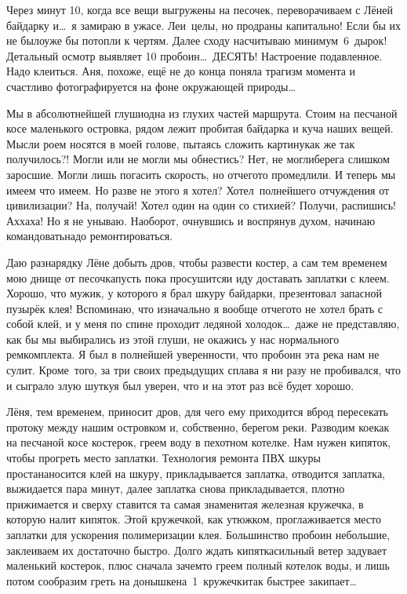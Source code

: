 Через минут 10, когда все вещи выгружены на песочек, переворачиваем с Лёней байдарку и\ldots~я замираю в ужасе. Леи~целы, но продраны капитально! Если бы их не было\mdash уже бы потопли к чертям. Далее сходу насчитываю минимум~6~дырок! Детальный осмотр выявляет 10 пробоин\ldots~ДЕСЯТЬ! Настроение подавленное. Надо клеиться. Аня, похоже, ещё не до конца поняла трагизм момента и счастливо фотографируется на фоне окружающей природы\ldots~

Мы в абсолютнейшей глуши\mdash одна из глухих частей маршрута. Стоим на песчаной косе маленького островка, рядом лежит пробитая байдарка и куча наших вещей. Мысли роем носятся в моей голове, пытаясь сложить картину\mdash как же так получилось?! Могли или не могли мы обнестись? Нет, не могли\mdash берега слишком заросшие. Могли лишь погасить скорость, но отчего\sdash то промедлили. И теперь мы имеем что имеем. Но разве не этого я хотел? Хотел~полнейшего отчуждения от цивилизации? На, получай! Хотел один на один со стихией? Получи, распишись! Ах\sdash ха\sdash ха! Но я не унываю. Наоборот, очнувшись и воспрянув духом, начинаю командовать\mdash надо ремонтироваться. 

Даю разнарядку Лёне добыть дров, чтобы развести костер, а сам тем временем мою днище от песочка\mdash пусть пока просушится\mdash и иду доставать заплатки с клеем. Хорошо, что мужик, у которого я брал шкуру байдарки, презентовал запасной пузырёк клея! Вспоминаю, что изначально я вообще отчего\sdash то не хотел брать с собой клей, и у меня по спине проходит ледяной холодок\ldots~даже не представляю, как бы мы выбирались из этой глуши, не окажись у нас нормального ремкомплекта. Я был в полнейшей уверенности, что пробоин эта река нам не сулит. Кроме~того, за три своих предыдущих сплава я ни разу не пробивался, что и сыграло злую шутку\mdash я был уверен, что и на этот раз всё будет хорошо.
 
Лёня, тем временем, приносит дров, для чего ему приходится вброд пересекать протоку между нашим островком и, собственно, берегом реки. Разводим кое\sdash как на песчаной косе костерок, греем воду в пехотном котелке. Нам нужен кипяток, чтобы прогреть место заплатки. Технология ремонта ПВХ шкуры проста\mdash наносится клей на шкуру, прикладывается заплатка, отводится заплатка, выжидается пара минут, далее заплатка снова прикладывается, плотно прижимается и сверху ставится та самая знаменитая железная кружечка, в которую налит кипяток. Этой кружечкой, как утюжком, проглаживается место заплатки для ускорения полимеризации клея. Большинство пробоин небольшие, заклеиваем их достаточно быстро. Долго ждать кипятка\mdash сильный ветер задувает маленький костерок, плюс сначала зачем\sdash то греем полный котелок воды, и лишь потом сообразим греть на донышке\mdash на~1~кружечки\mdash так быстрее закипает\ldots~

